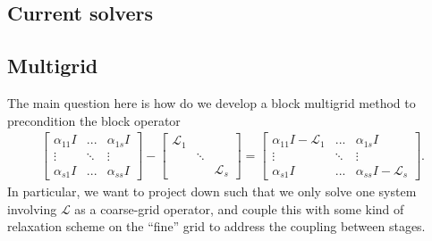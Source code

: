 \documentclass[a4paper,10pt]{article}
\begin{document}
\subsection{Current solvers}\label{sec:mg:solver}





\subsection{Multigrid}\label{sec:mg:mg}

The main question here is how do we develop a block multigrid method to precondition
the block operator
%
\begin{align}\label{eq:k3}
\begin{bmatrix} \alpha_{11} I & ... & \alpha_{1s}I  \\ \vdots & \ddots & \vdots
		\\ \alpha_{s1}I &  ... & \alpha_{ss}I\end{bmatrix}
	- \begin{bmatrix} \mathcal{L}_1 &  \\
	 & \ddots & \\ & & \mathcal{L}_s \end{bmatrix} = 
\begin{bmatrix} \alpha_{11} I - \mathcal{L}_1 & ... & \alpha_{1s}I  \\ \vdots & \ddots & \vdots
		\\ \alpha_{s1}I &  ... & \alpha_{ss}I - \mathcal{L}_s\end{bmatrix}.
\end{align}
%
In particular, we want to project down such that we only solve one system involving
$\mathcal{L}$ as a coarse-grid operator, and couple this with some kind of relaxation
scheme on the ``fine'' grid to address the coupling between stages.
\end{document}
